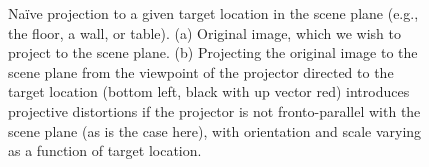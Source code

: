 \documentclass[review]{elsarticle}
\begin{document}
\begin{figure}
    \centering
    \qquad
    \caption{Na\"ive projection to a given target location in the scene plane (e.g., the floor, a wall, or table). (a) Original image, which we wish to project to the scene plane. (b) Projecting the original image to the scene plane from the viewpoint of the projector directed to the target location (bottom left, black with up vector red) introduces projective distortions if the projector is not fronto-parallel with the scene plane (as is the case here), with orientation and scale varying as a function of target location.}
    \label{fig:proj}
\end{figure}
\end{document}
